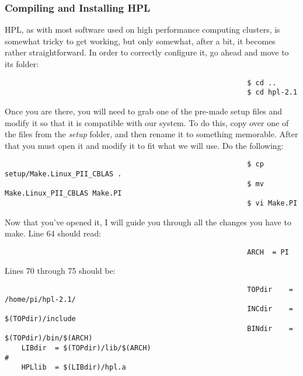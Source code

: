 \documentclass[]{article}
\begin{document}
                                                          \subsubsection{Compiling and Installing HPL}
                                                          HPL, as with most software used on high performance computing clusters, is somewhat tricky to get working, but only somewhat, after a 
                                                          bit, it becomes rather straightforward. In order to correctly configure it, go ahead and move to its folder:
                                                          \begin{lstlisting}
                                                          $ cd ..
                                                          $ cd hpl-2.1
                                                          \end{lstlisting}
                                                          Once you are there, you will need to grab one of the pre-made setup files and modify it so that it is compatible with our system. To do 
                                                          this, copy over one of the files from the \textit{setup} folder, and then rename it to something memorable. After that you must open it 
                                                          and modify it to fit what we will use. Do the following:
                                                          \begin{lstlisting}
                                                          $ cp setup/Make.Linux_PII_CBLAS .
                                                          $ mv Make.Linux_PII_CBLAS Make.PI
                                                          $ vi Make.PI
                                                          \end{lstlisting}
                                                          Now that you've opened it, I will guide you through all the changes you have to make. Line 64 should read:
                                                          \begin{lstlisting}
                                                          ARCH  = PI
                                                          \end{lstlisting}
                                                          Lines 70 through 75 should be:
                                                          \begin{lstlisting}
                                                          TOPdir    = /home/pi/hpl-2.1/
                                                          INCdir    = $(TOPdir)/include
                                                          BINdir    = $(TOPdir)/bin/$(ARCH)
    LIBdir  = $(TOPdir)/lib/$(ARCH)
#
    HPLlib  = $(LIBdir)/hpl.a
    \end{lstlisting}
\end{document}
